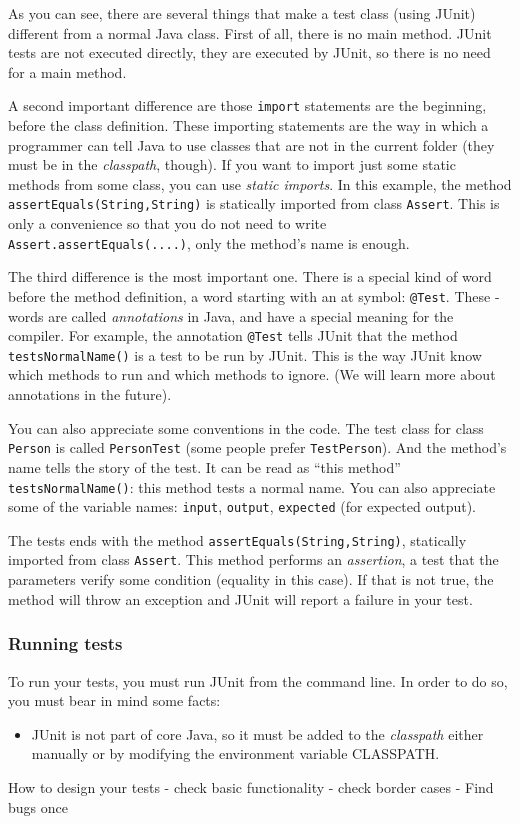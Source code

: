 As you can see, there are several things that make a test class (using
JUnit) different from a normal Java class. First of all, there is no
main method. JUnit tests are not executed directly, they are executed
by JUnit, so there is no need for a main method. 

A second important difference are those \verb+import+ statements are
the beginning, before the class definition. These importing statements
are the way in which a programmer can tell Java to use classes that
are not in the current folder (they must be in the \emph{classpath},
though). If you want to import just some static methods from some
class, you can use \emph{static imports}. In this example, the method
\verb+assertEquals(String,String)+ is statically imported from class
\verb+Assert+. This is only a convenience so that you do not need to
write \verb+Assert.assertEquals(....)+, only the method's name is
enough. 

The third difference is the most important one. There is a special
kind of word before the method definition, a word starting with an at
symbol: \verb+@Test+. These \@-words are called \emph{annotations} in
Java, and have a special meaning for the compiler. For example, the
annotation \verb+@Test+ tells JUnit that the method
\verb+testsNormalName()+ is a test to be run by JUnit. This is the way
JUnit know which methods to run and which methods to ignore. (We will
learn more about annotations in the future).

You can also appreciate some conventions in the code. The test class
for class \verb+Person+ is called \verb+PersonTest+ (some people
prefer \verb+TestPerson+). And the method's name tells the story of
the test. It can be read as ``this method'' \verb+testsNormalName()+:
this method tests a normal name. You can also appreciate some of the
variable names: \verb+input+, \verb+output+, \verb+expected+ (for
expected output). 

The tests ends with the method \verb+assertEquals(String,String)+,
statically imported from class \verb+Assert+. This method performs an
\emph{assertion}, a test that the parameters verify some condition
(equality in this case). If that is not true, the method will throw an
exception and JUnit will report a failure in your test. 

\subsubsection{Running tests}
\label{sec:running-tests}

To run your tests, you must run JUnit from the command line. In order
to do so, you must bear in mind some facts: 

\begin{itemize}
\item JUnit is not part of core Java, so it must be added to the
  \emph{classpath} either manually or by modifying the environment
  variable CLASSPATH. 
\end{itemize}



How to design your tests
  - check basic functionality
  - check border cases
  - Find bugs once

